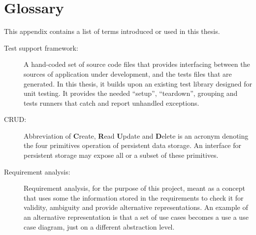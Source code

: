 \chapter{Glossary}
\label{appendix:glossary}
This appendix contains a list of terms introduced or used in this thesis.
\begin{description}
  \item[Test support framework:] A hand-coded set of source code files that provides interfacing between the sources of application under development, and the tests files that are generated. In this thesis, it builds upon an existing test library designed for unit testing. It provides the needed ``setup'', ``teardown'', grouping and tests runners that catch and report unhandled exceptions.
  \item[CRUD:] Abbreviation of \textbf{C}reate, \textbf{R}ead \textbf{U}pdate and \textbf{D}elete is an acronym denoting the four primitives operation of persistent data storage. An interface for persistent storage may expose all or a subset of these primitives.
  \item[Requirement analysis:] Requirement analysis, for the purpose of this project, meant as a concept that uses some the information stored in the requirements to check it for validity, ambiguity and provide alternative representations. An example of an alternative representation is that a set of use cases becomes a use a use case diagram, just on a different abstraction level.
\end{description}
